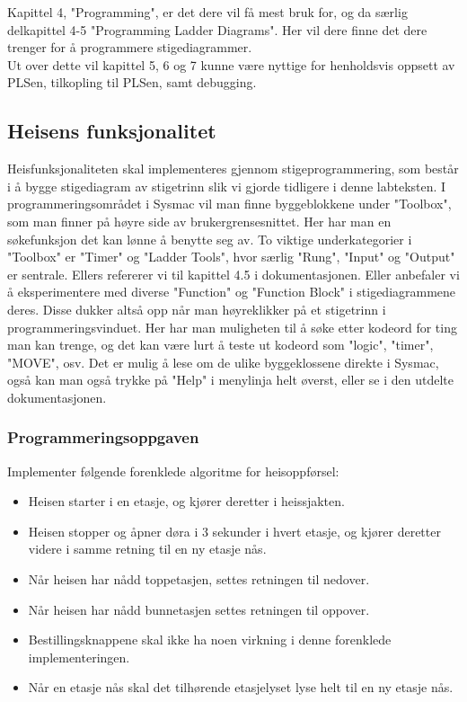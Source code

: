 Kapittel 4, "Programming", er det dere vil få mest bruk for, og da særlig delkapittel 4-5 "Programming Ladder Diagrams". Her vil dere finne det dere trenger for å programmere stigediagrammer.\\

Ut over dette vil kapittel 5, 6 og 7 kunne være nyttige for henholdsvis oppsett av PLSen, tilkopling til PLSen, samt debugging.\\

\subsection{Heisens funksjonalitet}
Heisfunksjonaliteten skal implementeres gjennom stigeprogrammering, som består i å bygge stigediagram av stigetrinn slik vi gjorde tidligere i denne labteksten. I programmeringsområdet i Sysmac vil man finne byggeblokkene under "Toolbox", som man finner på høyre side av brukergrensesnittet. Her har man en søkefunksjon det kan lønne å benytte seg av. To viktige underkategorier i "Toolbox" er "Timer" og "Ladder Tools", hvor særlig "Rung", "Input" og "Output" er sentrale. Ellers refererer vi til kapittel 4.5 i dokumentasjonen. Eller anbefaler vi å eksperimentere med diverse "Function" og "Function Block" i stigediagrammene deres. Disse dukker altså opp når man høyreklikker på et stigetrinn i programmeringsvinduet. Her har man muligheten til å søke etter kodeord for ting man kan trenge, og det kan være lurt å teste ut kodeord som "logic", "timer", "MOVE", osv. Det er mulig å lese om de ulike byggeklossene direkte i Sysmac, også kan man også trykke på "Help" i menylinja helt øverst, eller se i den utdelte dokumentasjonen.

\subsubsection{Programmeringsoppgaven}
Implementer følgende forenklede algoritme for heisoppførsel:

\begin{itemize}
    \item Heisen starter i en etasje, og kjører deretter i heissjakten.
    \item Heisen stopper og åpner døra i 3 sekunder i hvert etasje, og kjører deretter videre i samme retning til en ny etasje nås.
    \item Når heisen har nådd toppetasjen, settes retningen til nedover. 
    \item Når heisen har nådd bunnetasjen settes retningen til oppover. 
    \item Bestillingsknappene skal ikke ha noen virkning i denne forenklede implementeringen.
    \item Når en etasje nås skal det tilhørende etasjelyset lyse helt til en ny etasje nås.
\end{itemize}